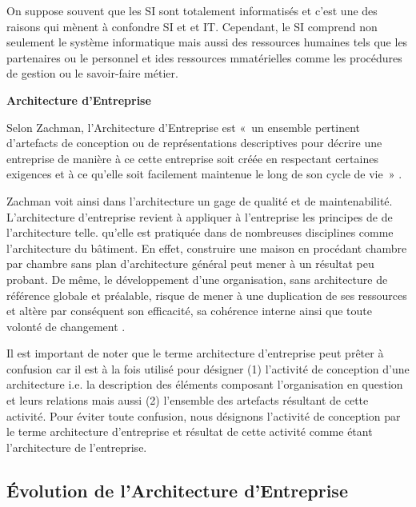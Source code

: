 On suppose souvent que les SI sont totalement informatisés et c'est une des 
raisons qui mènent à confondre SI et et IT. Cependant, le SI comprend non seulement 
le système informatique mais aussi des ressources humaines tels que les partenaires 
ou le personnel et ides ressources mmatérielles comme les procédures de gestion ou le savoir-faire métier.

\textbf{Architecture d'Entreprise}

Selon Zachman, l'Architecture d'Entreprise est «~un ensemble pertinent d'artefacts de conception ou de représentations descriptives pour décrire une entreprise de manière à ce cette entreprise soit créée en respectant certaines exigences et à ce qu'elle soit facilement maintenue le long de son cycle de vie~» \cite{zachman1997enterprise}. 

Zachman voit ainsi dans l'architecture un gage de qualité et de maintenabilité. L'architecture d'entreprise revient à appliquer à l'entreprise les principes de de l'architecture telle. qu'elle est pratiquée dans de nombreuses disciplines comme l'architecture du bâtiment. En effet, construire une maison en procédant chambre par chambre sans plan d'architecture général peut mener à un résultat peu probant. De même, le développement d'une organisation, sans 
architecture de référence globale et préalable, risque de mener à une 
duplication de ses ressources et altère par conséquent son efficacité, sa cohérence interne ainsi que toute volonté de changement \cite{zachman1997enterprise} \cite{bernard2012introduction}. 

Il est important de noter que le terme architecture d'entreprise peut prêter à 
confusion car il est à la fois utilisé pour désigner (1) l'activité de 
conception d'une architecture i.e. la description des éléments composant 
l'organisation en question et leurs relations mais aussi (2) l'ensemble des 
artefacts résultant de cette activité. 
Pour éviter toute confusion, nous désignons l'activité de conception par le 
terme architecture d'entreprise et résultat de cette activité comme étant 
l'architecture de l'entreprise.


\subsection{Évolution de l'Architecture d'Entreprise}

